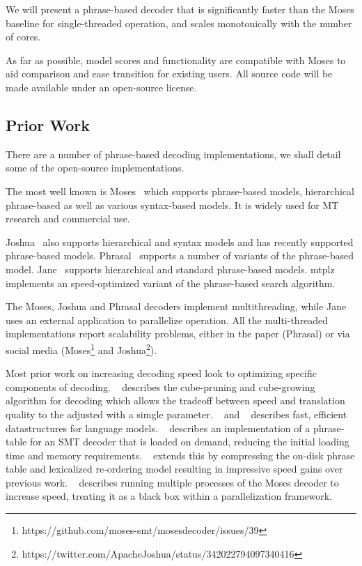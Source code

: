 \documentclass[11pt]{article}
\begin{document}
We will present a phrase-based decoder that is significantly faster than the Moses baseline for single-threaded operation, and scales monotonically with the number of cores.

As far as possible, model scores and functionality are compatible with Moses to aid comparison and ease transition for existing users. All source code will be made available under an open-source license.

\subsection{Prior Work}

There are a number of phrase-based decoding implementations, we shall detail some of the open-source implementations. 

The most well known is Moses~\cite{koehn-EtAl:2007:PosterDemo} which supports phrase-based models, hierarchical phrase-based as well as various syntax-based models. It is widely used for MT research and commercial use. 

Joshua~\cite{Joshua-Decoder} also supports hierarchical and syntax models and has recently supported phrase-based models. Phrasal~\cite{spence2014phrasal} supports a number of variants of the phrase-based model. Jane~\cite{peitz2012jane} supports hierarchical and standard phrase-based models. mtplz~ implements an speed-optimized variant of the phrase-based search algorithm.

The Moses, Joshua and Phrasal decoders implement multithreading, while Jane uses an external application to parallelize operation. All the multi-threaded implementations report scalability problems, either in the paper (Phrasal) or via social media (Moses\footnote{https://github.com/moses-smt/mosesdecoder/issues/39} and Joshua\footnote{https://twitter.com/ApacheJoshua/status/342022794097340416}).


Most prior work on increasing decoding speed look to optimizing specific components of decoding. ~ describes the cube-pruning and cube-growing algorithm for decoding which allows the tradeoff between speed and translation quality to the adjusted with a simgle parameter. ~ and ~ describes fast, efficient datastructures for language models. ~ describes an implementation of a phrase-table for an SMT decoder that is loaded on demand, reducing the initial loading time and memory requirements. ~ extends this by compressing the on-disk phrase table and lexicalized re-ordering model resulting in impressive speed gains over previous work. ~ describes running multiple processes of the Moses decoder to increase speed, treating it as a black box within a parallelization framework.
\end{document}
